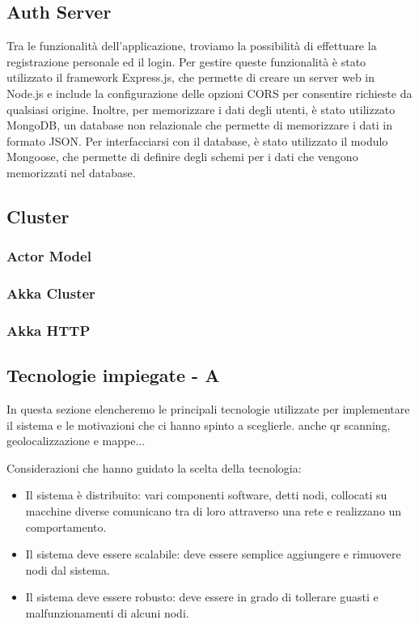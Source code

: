 \subsection{Auth Server}


Tra le funzionalità dell'applicazione, troviamo la possibilità di effettuare la
registrazione personale ed il login. Per gestire queste funzionalità è stato utilizzato
il framework Express.js, che permette di creare un server web in Node.js e include
la configurazione delle opzioni CORS per consentire richieste da qualsiasi origine.
Inoltre, per memorizzare i dati degli utenti, è stato utilizzato MongoDB,
un database non relazionale che permette di memorizzare i dati in formato JSON.
Per interfacciarsi con il database, è stato utilizzato il modulo Mongoose, che
permette di definire degli schemi per i dati che vengono memorizzati nel database.



\subsection{Cluster}
\subsubsection{Actor Model}
\subsubsection{Akka Cluster}
\subsubsection{Akka HTTP}

\subsection{Tecnologie impiegate - A}
In questa sezione elencheremo le principali tecnologie utilizzate per implementare il sistema e le motivazioni che ci hanno spinto a sceglierle.
anche qr scanning, geolocalizzazione e mappe...


Considerazioni che hanno guidato la scelta della tecnologia:
\begin{itemize}
    \item Il sistema è distribuito: vari componenti software, detti nodi, collocati su macchine diverse comunicano tra di loro attraverso una rete e realizzano un comportamento.
    \item Il sistema deve essere scalabile: deve essere semplice aggiungere e rimuovere nodi dal sistema.
    \item Il sistema deve essere robusto: deve essere in grado di tollerare guasti e malfunzionamenti di alcuni nodi.
\end{itemize}

